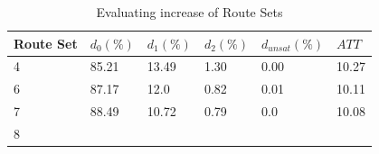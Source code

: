  \begin{table}[H]
    \centering
    \begin{tabular}{|l||l|l|l|l|l|}
    \hline
    Route Set & $d_0(\%)$ & $d_1(\%)$ & $d_2(\%)$ & $d_{unsat}(\%)$ & $ATT$ \\
    \hline
    4 & 85.21 & 13.49 & 1.30 & 0.00 & 10.27\\
    6 & 87.17 & 12.0 & 0.82 & 0.01 & 10.11\\
    7 & 88.49 & 10.72 & 0.79 & 0.0 & 10.08\\
    8\\
    \hline
    \end{tabular}
    \caption {Evaluating increase of Route Sets}
    \label{table:performanceComparison_routesets}
\end{table}

